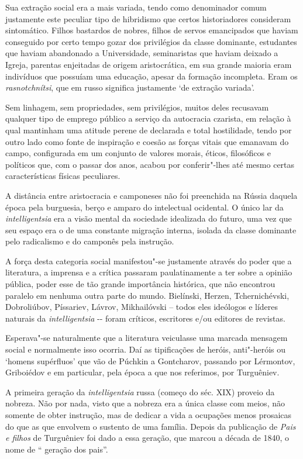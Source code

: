 Sua extração social era a mais variada, tendo como denominador comum
justamente este peculiar tipo de hibridismo que certos historiadores
consideram sintomático. Filhos bastardos de nobres, filhos de servos
emancipados que haviam conseguido por certo tempo gozar dos privilégios
da classe dominante, estudantes que haviam abandonado a Universidade,
seminaristas que haviam deixado a Igreja, parentas enjeitadas de origem
aristocrática, em sua grande maioria eram indivíduos que possuíam uma
educação, apesar da formação incompleta. Eram os \emph{rasnotchnítsi},
que em russo significa justamente `de extração variada'.

Sem linhagem, sem propriedades, sem privilégios, muitos deles recusavam
qualquer tipo de emprego público a serviço da autocracia czarista, em
relação à qual mantinham uma atitude perene de declarada e total
hostilidade, tendo por outro lado como fonte de inspiração e coesão as
forças vitais que emanavam do campo, configurada em um conjunto de
valores morais, éticos, filosóficos e políticos que, com o passar dos
anos, acabou por conferir"-lhes até mesmo certas características físicas
peculiares.

A distância entre aristocracia e camponeses não foi preenchida na Rússia
daquela época pela burguesia, berço e amparo do intelectual ocidental. O
único lar da \emph{intelligentsia} era a visão mental da sociedade
idealizada do futuro, uma vez que seu espaço era o de uma constante
migração interna, isolada da classe dominante pelo radicalismo e do
camponês pela instrução.

A força desta categoria social manifestou"-se justamente através do poder
que a literatura, a imprensa e a crítica passaram paulatinamente a ter
sobre a opinião pública, poder esse de tão grande importância histórica,
que não encontrou paralelo em nenhuma outra parte do mundo. Bielínski,
Herzen, Tchernichévski, Dobroliúbov, Píssariev, Lávrov, Mikhailóvski --
todos eles ideólogos e líderes naturais da \emph{intelligentsia} -\/-
foram críticos, escritores e/ou editores de revistas.

Esperava"-se naturalmente que a literatura veiculasse uma marcada
mensagem social e normalmente isso ocorria. Daí as tipificações de
heróis, anti"-heróis ou `homens supérfluos' que vão de Púchkin a
Gontcharov, passando por Lérmontov, Griboiédov e em particular, pela
época a que nos referimos, por Turguêniev.

A primeira geração da \emph{intelligentsia} { } russa (começo do séc.
XIX) proveio da nobreza. Não por nada, visto que a nobreza era a única
classe com meios, não somente de obter instrução, mas de dedicar a vida
a ocupações menos prosaicas do que as que envolvem o sustento de uma
família. Depois da publicação de \emph{Pais e filhos} de Turguêniev foi
dado a essa geração, que marcou a década de 1840, o nome de `` geração
dos pais''.

